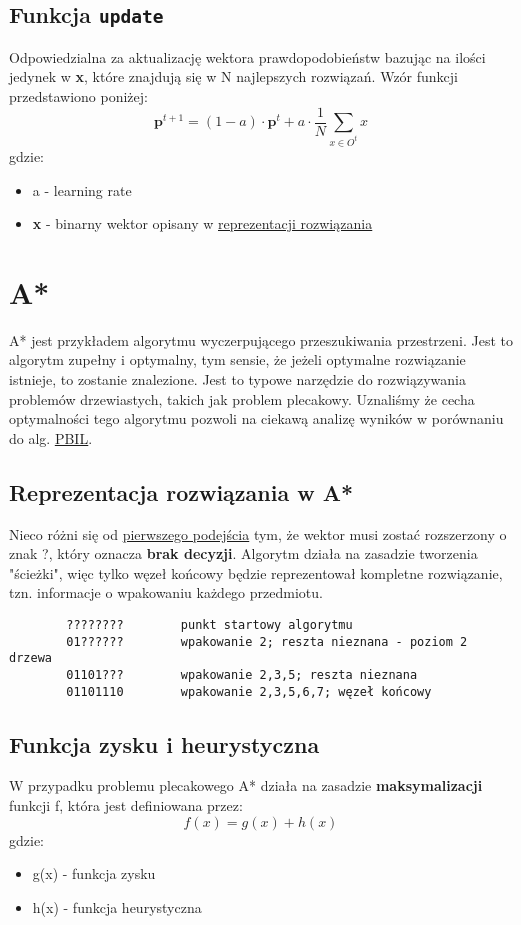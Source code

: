 \documentclass[11pt]{article}
\begin{document}
\subsection{Funkcja \texttt{update}}
\label{sec:orga4c09fd}
Odpowiedzialna za aktualizację wektora prawdopodobieństw bazując na ilości jedynek w \textbf{x}, które znajdują się w N najlepszych rozwiązań. Wzór funkcji przedstawiono poniżej:
\[
        \boldsymbol{p}^{t+1}=(1-a) \cdot \boldsymbol{p}^t + a \cdot \frac{1}{N} \sum_{x \in O^t}x
\]
gdzie:
\begin{itemize}
\item a - learning rate
\item \textbf{x} - binarny wektor opisany w \hyperref[sec:org7c490b7]{\uline{reprezentacji rozwiązania}}
\end{itemize}
\section{A*}
\label{sec:orgd1b064a}
A* jest przykładem algorytmu wyczerpującego przeszukiwania przestrzeni. Jest to algorytm zupełny i optymalny, tym sensie, że jeżeli optymalne rozwiązanie istnieje, to zostanie znalezione. Jest to typowe narzędzie do rozwiązywania problemów drzewiastych, takich jak problem plecakowy. Uznaliśmy że cecha optymalności tego algorytmu pozwoli na ciekawą analizę wyników w porównaniu do alg. \hyperref[sec:org5c31017]{\uline{PBIL}}.
\subsection{Reprezentacja rozwiązania w A*}
\label{sec:org4ecd5a9}
Nieco różni się od \hyperref[sec:org7c490b7]{pierwszego podejścia} tym, że wektor musi zostać rozszerzony o znak ?, który oznacza \textbf{brak decyzji}. Algorytm działa na zasadzie tworzenia "ścieżki", więc tylko węzeł końcowy będzie reprezentował kompletne rozwiązanie, tzn. informacje o wpakowaniu każdego przedmiotu.
\begin{verbatim}
        ????????        punkt startowy algorytmu
        01??????        wpakowanie 2; reszta nieznana - poziom 2 drzewa
        01101???        wpakowanie 2,3,5; reszta nieznana
        01101110        wpakowanie 2,3,5,6,7; węzeł końcowy
\end{verbatim}
\subsection{Funkcja zysku i heurystyczna}
\label{sec:orgd7b7848}
W przypadku problemu plecakowego A* działa na zasadzie \textbf{maksymalizacji} funkcji f, która jest definiowana przez:
\[
        f(x) = g(x) + h(x)
\]
gdzie:
\begin{itemize}
\item g(x) - funkcja zysku
\item h(x) - funkcja heurystyczna
\end{itemize}
\end{document}
